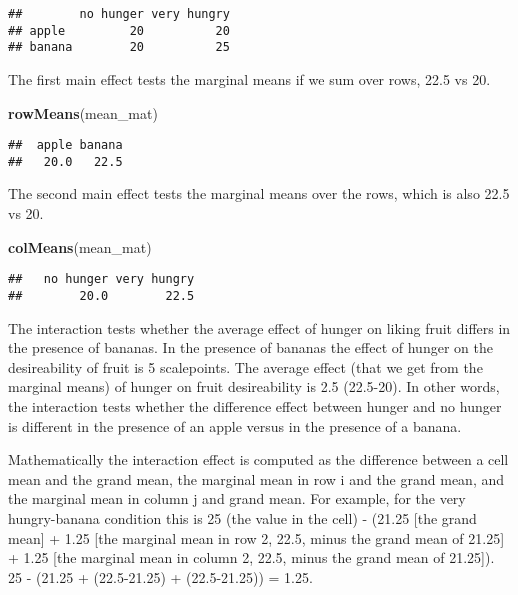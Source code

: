 \documentclass[]{article}
\newenvironment{Shaded}{\begin{snugshade}}{\end{snugshade}}
\newcommand{\KeywordTok}[1]{\textcolor[rgb]{0.13,0.29,0.53}{\textbf{#1}}}
\newcommand{\NormalTok}[1]{#1}
\begin{document}
\begin{verbatim}
##        no hunger very hungry
## apple         20          20
## banana        20          25
\end{verbatim}

The first main effect tests the marginal means if we sum over rows, 22.5
vs 20.

\begin{Shaded}
\begin{Highlighting}[]
\KeywordTok{rowMeans}\NormalTok{(mean_mat)}
\end{Highlighting}
\end{Shaded}

\begin{verbatim}
##  apple banana 
##   20.0   22.5
\end{verbatim}

The second main effect tests the marginal means over the rows, which is
also 22.5 vs 20.

\begin{Shaded}
\begin{Highlighting}[]
\KeywordTok{colMeans}\NormalTok{(mean_mat)}
\end{Highlighting}
\end{Shaded}

\begin{verbatim}
##   no hunger very hungry 
##        20.0        22.5
\end{verbatim}

The interaction tests whether the average effect of hunger on liking
fruit differs in the presence of bananas. In the presence of bananas the
effect of hunger on the desireability of fruit is 5 scalepoints. The
average effect (that we get from the marginal means) of hunger on fruit
desireability is 2.5 (22.5-20). In other words, the interaction tests
whether the difference effect between hunger and no hunger is different
in the presence of an apple versus in the presence of a banana.

Mathematically the interaction effect is computed as the difference
between a cell mean and the grand mean, the marginal mean in row i and
the grand mean, and the marginal mean in column j and grand mean. For
example, for the very hungry-banana condition this is 25 (the value in
the cell) - (21.25 {[}the grand mean{]} + 1.25 {[}the marginal mean in
row 2, 22.5, minus the grand mean of 21.25{]} + 1.25 {[}the marginal
mean in column 2, 22.5, minus the grand mean of 21.25{]}). 25 - (21.25 +
(22.5-21.25) + (22.5-21.25)) = 1.25.
\end{document}
